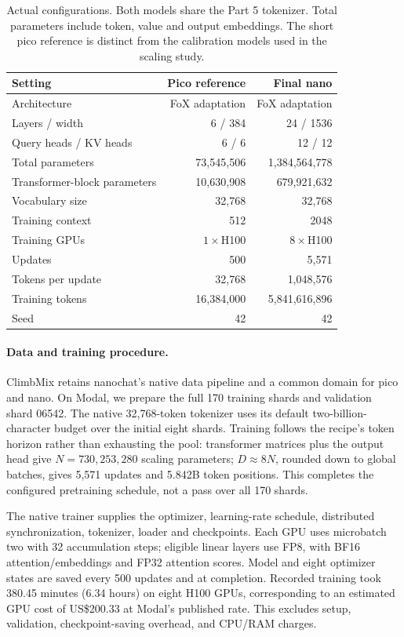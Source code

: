 \documentclass[11pt]{article}
\begin{document}
\begin{table}[htbp]
\centering\small
\begin{tabular}{lrr}
\hline
Setting & Pico reference & Final nano \\
\hline
Architecture & FoX adaptation & FoX adaptation \\
Layers / width & 6 / 384 & 24 / 1536 \\
Query heads / KV heads & 6 / 6 & 12 / 12 \\
Total parameters & 73,545,506 & 1,384,564,778 \\
Transformer-block parameters & 10,630,908 & 679,921,632 \\
Vocabulary size & 32,768 & 32,768 \\
Training context & 512 & 2048 \\
Training GPUs & $1\times$H100 & $8\times$H100 \\
Updates & 500 & 5,571 \\
Tokens per update & 32,768 & 1,048,576 \\
Training tokens & 16,384,000 & 5,841,616,896 \\
Seed & 42 & 42 \\
\hline
\end{tabular}
\caption{Actual configurations. Both models share the Part 5 tokenizer. Total
parameters include token, value and output embeddings. The short pico
reference is distinct from the calibration models used in the scaling study.}
\label{tab:p5-config}
\end{table}

\paragraph{Data and training procedure.}
ClimbMix retains nanochat's native data pipeline and a common domain for pico
and nano. On Modal, we prepare the full 170 training shards and validation shard 06542.
The native 32,768-token tokenizer uses its default two-billion-character
budget over the initial eight shards. Training follows the recipe's token
horizon rather than exhausting the pool: transformer matrices plus the output
head give $N=730{,}253{,}280$ scaling parameters; $D\approx8N$, rounded down
to global batches, gives 5,571 updates and 5.842B token positions. This completes
the configured pretraining schedule, not a pass over all 170 shards.

The native trainer supplies the optimizer, learning-rate schedule, distributed
synchronization, tokenizer, loader and checkpoints. Each GPU uses microbatch
two with 32 accumulation steps; eligible linear layers use FP8, with BF16
attention/embeddings and FP32 attention scores. Model and eight optimizer
states are saved every 500 updates and at completion. Recorded training took 380.45 minutes (6.34 hours) on eight H100 GPUs,
corresponding to an estimated GPU cost of US\$200.33 at Modal's published
rate\cite{modal-pricing}. This excludes setup, validation, checkpoint-saving
overhead, and CPU/RAM charges.
\end{document}
